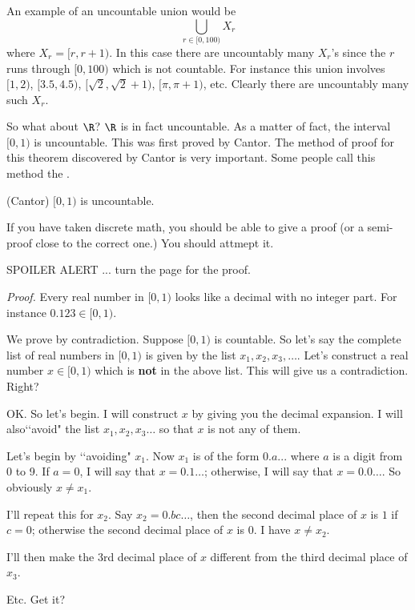 An example of an uncountable union would be
\[
\bigcup_{r \in [0, 100)} X_r
\]
where $X_r = [r, r + 1)$.
  In this case there are uncountably many $X_r$'s since the
  $r$ runs through $[0, 100)$ which is not countable.
    For instance this union involves $[1, 2)$,
      $[3.5, 4.5)$,
      $[\sqrt{2}, \sqrt{2} + 1)$,
      $[\pi, \pi + 1)$, etc.
Clearly there are uncountably many such $X_r$.
            
\newpage
So what about $\R$? $\R$ is in fact uncountable. As a matter of
fact, the interval $[0,1)$ is uncountable.
This was first proved by Cantor.
The method of proof for
this theorem discovered by Cantor
is very important. Some people call this method the
.

\begin{thm} \textnormal{(Cantor)}
$[0,1)$ is uncountable.
\end{thm}


If you have taken discrete math, you should be able to give a proof
(or a semi-proof close to the correct one.)
You should attmept it.

SPOILER ALERT ... turn the page for the proof.


\newpage
\textit{Proof.} Every real number in $[0,1)$ looks like a decimal with no
integer part. For instance $0.123 \in [0,1)$.

We prove by contradiction. Suppose $[0,1)$ is countable. So let's say
the complete list of real numbers in $[0,1)$ is given by the list
$x_1, x_2, x_3, \ldots$. Let's construct a real number $x \in
[0,1)$ which is \textbf{not} in the above list. This will give us a
contradiction. Right?

OK. So let's begin. I will construct $x$ by giving you the decimal
expansion. I will also\lq\lq avoid" the list $x_1, x_2, x_3\ldots$
so that $x$ is not any of them.

Let's begin by \lq\lq avoiding" $x_1$. Now $x_1$ is of the form
$0.a...$ where $a$ is a digit from 0 to 9. If $a=0$, I will say
that $x=0.1\ldots$; otherwise, I will say that $x=0.0\ldots$. So
obviously $x \neq x_1$.

I'll repeat this for $x_2$. Say $x_2 =
0.bc\ldots$, then the second decimal place of $x$ is $1$ if $c=0$;
otherwise the second decimal place of $x$ is $0$.
I have $x \neq x_2$.

I'll then make the 3rd decimal place of $x$ different from the
third decimal place of $x_3$.

Etc. Get it?

